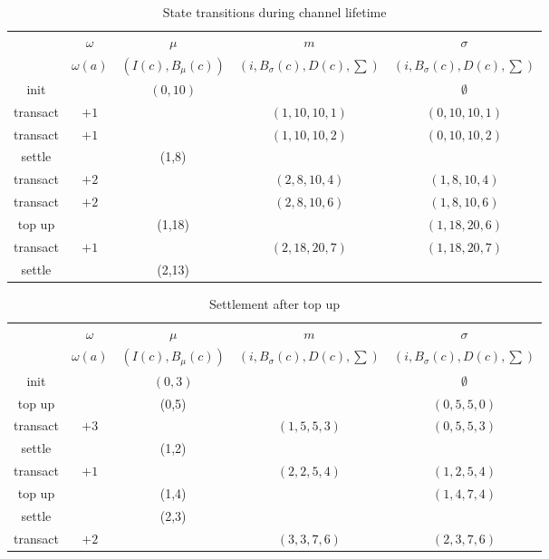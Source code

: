 \documentclass{llncs}
\begin{document}
\begin{table}[t]
  \begin{tabularx}{\textwidth}{| S | S | C | C | C |}
       & $\omega$ & $\mu$ & $m$ & $\sigma$ \\ 
       & $\omega(a)$ & $(I(c), B_\mu(c))$ & $(i, B_\sigma(c), D(c), \sum)$ & $(i, B_\sigma(c), D(c), \sum)$ \\
  \hhline{-====}
      init & & $(0,10)$ & & $\emptyset$ \\
      transact & $+1$ & & $(1, 10, 10, 1)$& $(0, 10, 10, 1)$ \\
      transact & $+1$ & & $(1, 10, 10, 2)$& $(0, 10, 10, 2)$ \\
      settle & & (1,8) & & \\
      transact & $+2$  & & $(2, 8, 10, 4)$ & $(1, 8, 10, 4)$ \\
      transact & $+2$  & & $(2, 8, 10, 6)$ & $(1, 8, 10, 6)$ \\
      top up & & (1,18) & & $(1, 18, 20, 6)$ \\
      transact & $+1$ & & $(2, 18, 20, 7)$ & $(1, 18, 20, 7)$ \\
      settle & & (2,13) & & \\
  \end{tabularx}
  \medskip
  \caption{State transitions during channel lifetime}
\end{table}


\begin{table}[t]
  \begin{tabularx}{\textwidth}{| S | S | C | C | C |}
       & $\omega$ & $\mu$ & $m$ & $\sigma$ \\ 
       & $\omega(a)$ & $(I(c), B_\mu(c))$ & $(i, B_\sigma(c), D(c), \sum)$ & $(i, B_\sigma(c), D(c), \sum)$ \\
  \hhline{-====}
      init & & $(0,3)$ & & $\emptyset$ \\
      top up & & (0,5) & & $(0, 5, 5, 0)$ \\
      transact & $+3$ & & $(1, 5, 5, 3)$ & $(0, 5, 5, 3)$ \\
      settle & & (1,2) & & \\
      transact & $+1$ & & $(2, 2, 5, 4)$ & $(1, 2, 5, 4)$ \\
      top up & & (1,4) & & $(1, 4, 7, 4)$ \\
      settle & & (2,3) & & \\
      transact & $+2$ & & $(3, 3, 7, 6)$ & $(2, 3, 7, 6)$ \\
  \end{tabularx}
  \medskip
  \caption{Settlement after top up}
\end{table}
\end{document}

